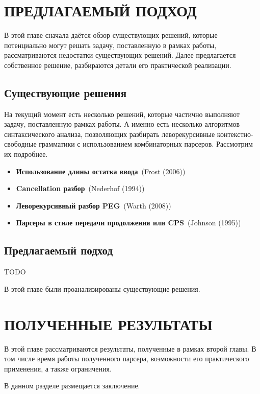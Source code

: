 \documentclass[times]{itmo-student-thesis}
\begin{document}
\chapter{ПРЕДЛАГАЕМЫЙ ПОДХОД}

В этой главе сначала даётся обзор существующих решений, которые потенциально могут решать задачу, поставленную в рамках 
работы, рассматриваются недостатки существующих решений. Далее предлагается собственное решение, разбираются детали его
практической реализации.

\section{Существующие решения}\label{sec:existing_solutions}

На текущий момент есть несколько решений, которые частично выполняют задачу, поставленную рамках работы. А именно есть
несколько алгоритмов синтаксического анализа, позволяющих разбирать леворекурсивные контекстно-свободные грамматики с
использованием комбинаторных парсеров. Рассмотрим их подробнее.

\begin{itemize}
    \item \textbf{Использование длины остатка ввода}~(Frost (2006)\cite{frost_new_2006})
    \item \textbf{Cancellation разбор}~(Nederhof (1994)\cite{nederhof_linguistic_1994})
    \item \textbf{Леворекурсивный разбор PEG}~(Warth (2008)\cite{warth_packrat_2008})
    \item \textbf{Парсеры в стиле передачи продолжения или CPS}~(Johnson (1995)\cite{johnson_memoization_nodate})
\end{itemize}

\section{Предлагаемый подход}\label{sec:existing_solutions}

TODO

\chapterconclusion

В этой главе были проанализированы существующие решения.

\chapter{ПОЛУЧЕННЫЕ РЕЗУЛЬТАТЫ}

В этой главе рассматриваются результаты, полученные в рамках второй главы. В том числе время работы полученного парсера,
возможности его практического применения, а также ограничения. 


\startconclusionpage

В данном разделе размещается заключение.

\printmainbibliography
\end{document}
